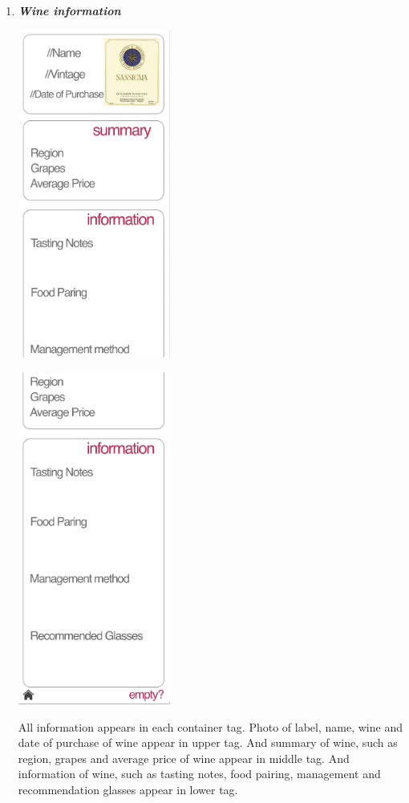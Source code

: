 \documentclass[conference]{IEEEtran}
\numberwithin{figure}{subsection}
\begin{document}
\begin{enumerate}
\begin{enumerate}
\begin{enumerate}
        \end{enumerate}
         \item \textit{\textbf{Wine information}}\\
         \centerline{\includegraphics[width=5cm]{wineinfo.png}}
         \centerline{\includegraphics[width=5cm]{wineinfo2.png}}
        All information appears in each container tag. Photo of label, name, wine and date of purchase of wine appear in upper tag. And summary of wine, such as region, grapes and average price of wine appear in middle tag. And information of wine, such as tasting notes, food pairing, management and recommendation glasses appear in lower tag.

\end{enumerate}
\end{enumerate}
\end{document}
